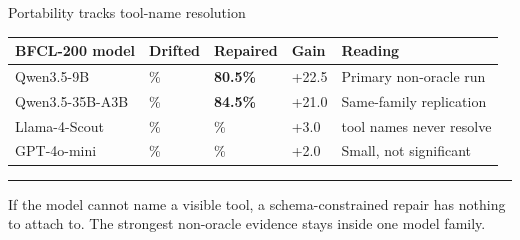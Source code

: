 \documentclass[aspectratio=169,11pt]{beamer}
\newcommand{\hairline}{{\color{Rule}\rule{\textwidth}{0.5pt}}\par}
\begin{document}
\begin{frame}{Portability tracks tool-name resolution}
  \vspace{0.30cm}
  \renewcommand{\arraystretch}{1.26}
  {\fontsize{10}{12.5}\selectfont
  \begin{tabular}{@{}>{\RaggedRight\arraybackslash}p{3.05cm}
                    >{\centering\arraybackslash}p{1.45cm}
                    >{\centering\arraybackslash}p{1.45cm}
                    >{\centering\arraybackslash}p{1.20cm}
                    >{\RaggedRight\arraybackslash}p{4.25cm}@{}}
    \toprule
    BFCL-200 model & Drifted & Repaired & Gain & Reading \\
    \midrule
    Qwen3.5-9B      & 58.0\% & \textbf{80.5\%} & +22.5 & Primary non-oracle run \\
    Qwen3.5-35B-A3B & 63.5\% & \textbf{84.5\%} & +21.0 & Same-family replication \\
    \addlinespace[0.30em]
    Llama-4-Scout   & 63.5\% & 66.5\%          & +3.0  & 43 tool names never resolve \\
    GPT-4o-mini     & 84.0\% & 86.0\%          & +2.0  & Small, not significant \\
    \bottomrule
  \end{tabular}}\par

  \vspace{0.36cm}
  \hairline
  \vspace{0.11cm}
  {\fontsize{10.5}{13.5}\selectfont
    If the model cannot name a visible tool, a schema-constrained repair has nothing to attach to. The strongest non-oracle evidence stays inside one model family.\par}

\end{frame}
\end{document}
